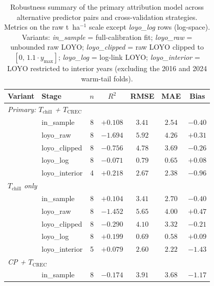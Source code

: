 \begin{table}[H]
\caption{Robustness summary of the primary attribution model across alternative
predictor pairs and cross-validation strategies. Metrics on the raw t~ha$^{-1}$
scale except \textit{loyo\_log} rows (log-space). Variants: \textit{in\_sample}
= full-calibration fit; \textit{loyo\_raw} = unbounded raw LOYO; \textit{loyo\_clipped}
= raw LOYO clipped to $[0,\,1.1\cdot y_{\max}]$; \textit{loyo\_log} = log-link LOYO;
\textit{loyo\_interior} = LOYO restricted to interior years (excluding the 2016 and
2024 warm-tail folds).\label{tab:robust_full}}
\centering
\footnotesize
\begin{tabular}{llccccc}
\toprule
\textbf{Variant} & \textbf{Stage} & \textbf{$n$} & \textbf{$R^{2}$} & \textbf{RMSE} & \textbf{MAE} & \textbf{Bias} \\
\midrule
\multicolumn{7}{l}{\textit{Primary: $T_{\text{chill}}$ + $T_{\text{CREC}}$}} \\
 & in\_sample      & 8 & $+0.108$ & $3.41$ & $2.54$ & $-0.40$ \\
 & loyo\_raw       & 8 & $\mathbf{-1.694}$ & $\mathbf{5.92}$ & $\mathbf{4.26}$ & $+0.31$ \\
 & loyo\_clipped   & 8 & $-0.756$ & $4.78$ & $3.69$ & $-0.26$ \\
 & loyo\_log       & 8 & $-0.071$ & $0.79$ & $0.65$ & $+0.08$ \\
 & loyo\_interior  & 4 & $+0.218$ & $2.67$ & $2.38$ & $-0.96$ \\
\midrule
\multicolumn{7}{l}{\textit{$T_{\text{chill}}$ only}} \\
 & in\_sample      & 8 & $+0.104$ & $3.41$ & $2.70$ & $-0.40$ \\
 & loyo\_raw       & 8 & $-1.452$ & $5.65$ & $4.00$ & $+0.47$ \\
 & loyo\_clipped   & 8 & $-0.290$ & $4.10$ & $3.32$ & $-0.21$ \\
 & loyo\_log       & 8 & $+0.199$ & $0.69$ & $0.58$ & $+0.09$ \\
 & loyo\_interior  & 5 & $+0.079$ & $2.60$ & $2.22$ & $-1.43$ \\
\midrule
\multicolumn{7}{l}{\textit{CP + $T_{\text{CREC}}$}} \\
 & in\_sample      & 8 & $-0.174$ & $3.91$ & $3.68$ & $-1.17$ \\

\end{tabular}
\end{table}
